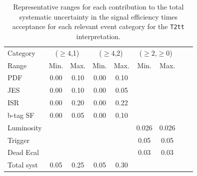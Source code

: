 \begin{table}[h!]
  \caption{Representative ranges for each contribution to the total
    systematic uncertainty in the signal efficiency times acceptance
    for each relevant event category for the \texttt{T2tt}
    interpretation.
    \label{tab:sms-syst-t2cc}
  }   
  \centering
  \begin{tabular}{ lcccccccc }
    \hline
    \hline
    Category   & \multicolumn{2}{c}{($\geq 4$,1)} & \multicolumn{2}{c}{($\geq 4$,2)}  & \multicolumn{2}{c}{($\geq 2$,$\geq 0$)} \\
    Range      & Min.   & Max.                & Min.   & Max.                     & Min.  & Max.        \\
    \hline
    PDF        & 0.00   & 0.10                & 0.00   & 0.10                     &         \\
    JES        & 0.00   & 0.10                & 0.00   & 0.05                     &             \\
    ISR        & 0.00   & 0.20                & 0.00   & 0.22                     &             \\
    b-tag SF   & 0.00   & 0.05                & 0.00   & 0.10                     &             \\
    Luminosity &        &                     &        &                          & 0.026 & 0.026        \\
    Trigger    &        &                     &        &                          & 0.05 & 0.05        \\
    Dead Ecal  &        &                     &        &                          & 0.03 & 0.03        \\
    \hline
    Total syst & 0.05   & 0.25                & 0.05   & 0.30                     &      &             \\
    \hline
    \hline
  \end{tabular}
\end{table}

